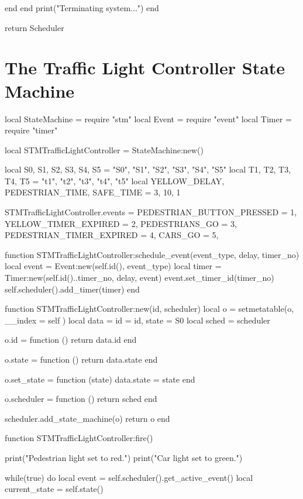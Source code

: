 \begin{appendices}
\begin{listing}[H]
\begin{luacode}
		end
	end
	print("Terminating system...")
end

return Scheduler
\end{luacode}
\end{listing}

\section{The Traffic Light Controller State Machine}
\label{sec:traffic_light_stm}

\begin{listing}[H]
\begin{luacode}
local StateMachine = require "stm"
local Event = require "event"
local Timer = require "timer"

local STMTrafficLightController = StateMachine:new()

local S0, S1, S2, S3, S4, S5 = "S0", "S1", "S2", "S3", "S4", "S5"
local T1, T2, T3, T4, T5 = "t1", "t2", "t3", "t4", "t5"
local YELLOW_DELAY, PEDESTRIAN_TIME, SAFE_TIME = 3, 10, 1

STMTrafficLightController.events = {
	PEDESTRIAN_BUTTON_PRESSED = 1,
	YELLOW_TIMER_EXPIRED = 2,
	PEDESTRIANS_GO = 3,
	PEDESTRIAN_TIMER_EXPIRED = 4,
	CARS_GO = 5,
}

function STMTrafficLightController:schedule_event(event_type, delay, timer_no)
	local event = Event:new(self.id(), event_type)
	local timer = Timer:new(self.id()..timer_no, delay, event)
	event.set_timer_id(timer_no)
	self.scheduler().add_timer(timer)
end

function STMTrafficLightController:new(id, scheduler)
	local o = {}
	setmetatable(o, { __index = self })
	local data = {id = id, state = S0}
	local sched = scheduler

	o.id = function ()
		return data.id
	end

	o.state = function ()
		return data.state
	end

	o.set_state = function (state)
		data.state = state
	end

	o.scheduler = function ()
		return sched
	end

	scheduler.add_state_machine(o)
	return o
end

function STMTrafficLightController:fire()

	print("Pedestrian light set to red.")
	print("Car light set to green.")

	while(true) do
		local event = self.scheduler().get_active_event()
		local current_state = self.state()


\end{luacode}
\end{listing}
\end{appendices}
